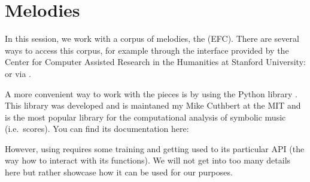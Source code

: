 \documentclass[letterpaper,10pt,english]{sphinxmanual}
\begin{document}
{
\begin{sphinxVerbatim}[commandchars=\\\{\}]
\llap{\color{nbsphinxin}[2]:\,\hspace{\fboxrule}\hspace{\fboxsep}}

\end{sphinxVerbatim}
}


\section{Melodies}
\label{\detokenize{02_melody_I:Melodies}}
In this session, we work with a corpus of melodies, the  (EFC). There are several ways to access this corpus, for example through the interface provided by the Center for Computer Assisted Research in the Humanities at Stanford University:  or via .

A more convenient way to work with the pieces is by using the Python library . This library was developed and is maintaned my Mike Cuthbert at the MIT and is the most popular library for the computational analysis of symbolic music (i.e. scores). You can find its documentation here: 

However, using  requires some training and getting used to its particular API (the way how to interact with its functions). We will not get into too many details here but rather showcase how it can be used for our purposes.
\end{document}
